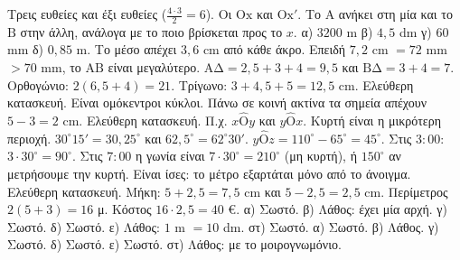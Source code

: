  Τρεις ευθείες και έξι ευθείες ($\frac{4\cdot3}{2}=6$).
 Οι $\mathrm{Οx}$ και $\mathrm{Οx'}$. Το $\mathrm{Α}$ ανήκει στη μία και το $\mathrm{Β}$ στην άλλη, ανάλογα με το ποιο βρίσκεται προς το $x$.
 α) $3200$ m \quad β) $4{,}5$ dm \quad γ) $60$ mm \quad δ) $0{,}85$ m.
 Το μέσο απέχει $3{,}6$ cm από κάθε άκρο. Επειδή $7{,}2$ cm $=72$ mm $>70$ mm, το $\mathrm{ΑΒ}$ είναι μεγαλύτερο.
 $\mathrm{ΑΔ}=2{,}5+3+4=9{,}5$ και $\mathrm{ΒΔ}=3+4=7$.
 Ορθογώνιο: $2(6{,}5+4)=21$. Τρίγωνο: $3+4{,}5+5=12{,}5$ cm.
 Ελεύθερη κατασκευή. Είναι ομόκεντροι κύκλοι. Πάνω σε κοινή ακτίνα τα σημεία απέχουν $5-3=2$ cm.
 Ελεύθερη κατασκευή. Π.χ. $x\hat{\mathrm{Ο}}y$ και $y\hat{\mathrm{Ο}}x$. Κυρτή είναι η μικρότερη περιοχή.
 $30^\circ15'=30{,}25^\circ$ και $62{,}5^\circ=62^\circ30'$.
 $y\hat{\mathrm{Ο}}z=110^\circ-65^\circ=45^\circ$.
 Στις $3{:}00$: $3\cdot30^\circ=90^\circ$. Στις $7{:}00$ η γωνία είναι $7\cdot30^\circ=210^\circ$ (μη κυρτή), ή $150^\circ$ αν μετρήσουμε την κυρτή.
 Είναι ίσες: το μέτρο εξαρτάται μόνο από το άνοιγμα.
 Ελεύθερη κατασκευή. Μήκη: $5+2{,}5=7{,}5$ cm και $5-2{,}5=2{,}5$ cm.
 Περίμετρος $2(5+3)=16$ μ. Κόστος $16\cdot2{,}5=40$ €.
 α) Σωστό. β) Λάθος: έχει μία αρχή. γ) Σωστό. δ) Σωστό. ε) Λάθος: $1$ m $=10$ dm. στ) Σωστό.
 α) Σωστό. β) Λάθος. γ) Σωστό. δ) Σωστό. ε) Σωστό. στ) Λάθος: με το μοιρογνωμόνιο.
